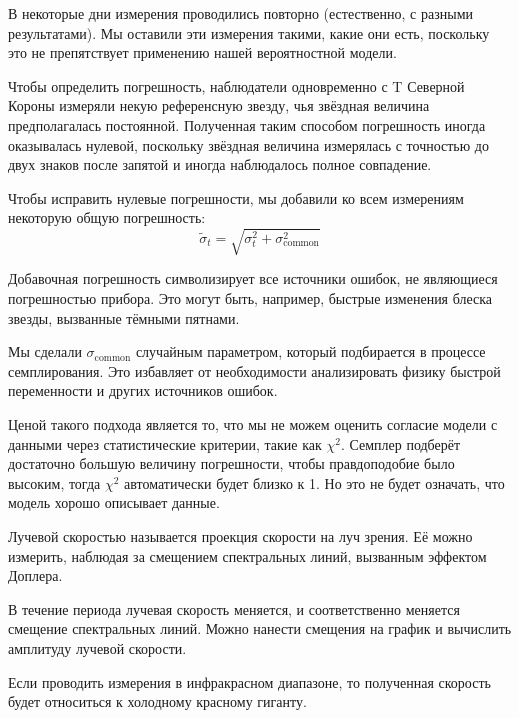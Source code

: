 В некоторые дни измерения проводились повторно (естественно, с разными результатами). Мы оставили эти измерения такими, какие они есть, поскольку это не препятствует применению нашей вероятностной модели.


Чтобы определить погрешность, наблюдатели одновременно с T Северной Короны измеряли некую референсную звезду, чья звёздная величина предполагалась постоянной. Полученная таким способом погрешность иногда оказывалась нулевой, поскольку звёздная величина измерялась с точностью до двух знаков после запятой и иногда наблюдалось полное совпадение.

Чтобы исправить нулевые погрешности, мы добавили ко всем измерениям некоторую общую погрешность:
\[
\tilde \sigma_t = \sqrt{\sigma_t^2 + \sigma_\text{common}^2}
\]

Добавочная погрешность символизирует все источники ошибок, не являющиеся погрешностью прибора. Это могут быть, например, быстрые изменения блеска звезды, вызванные тёмными пятнами.

Мы сделали $\sigma_\text{common}$ случайным параметром, который подбирается в процессе семплирования. Это избавляет от необходимости анализировать физику быстрой переменности и других источников ошибок.

Ценой такого подхода является то, что мы не можем оценить согласие модели с данными через статистические критерии, такие как $\chi^2$. Семплер подберёт достаточно большую величину погрешности, чтобы правдоподобие было высоким, тогда $\chi^2$ автоматически будет близко к 1. Но это не будет означать, что модель хорошо описывает данные.



Лучевой скоростью называется проекция скорости на луч зрения. Её можно измерить, наблюдая за смещением спектральных линий, вызванным эффектом Доплера.

В течение периода лучевая скорость меняется, и соответственно меняется смещение спектральных линий. Можно нанести смещения на график и вычислить амплитуду лучевой скорости.


Если проводить измерения в инфракрасном диапазоне, то полученная скорость будет относиться к холодному красному гиганту.

